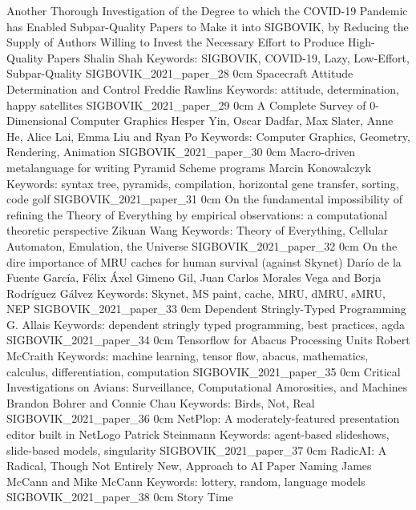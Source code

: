 \addpaper
	{Another Thorough Investigation of the Degree to which the COVID-19 Pandemic has Enabled Subpar-Quality Papers to Make it into SIGBOVIK, by Reducing the Supply of Authors Willing to Invest the Necessary Effort to Produce High-Quality Papers}
	{Shalin Shah}
	{Keywords: SIGBOVIK, COVID-19, Lazy, Low-Effort, Subpar-Quality}
	{SIGBOVIK_2021_paper_28}
	{0cm}
	{}
\addpaper
	{Spacecraft Attitude Determination and Control}
	{Freddie Rawlins}
	{Keywords: attitude, determination, happy satellites}
	{SIGBOVIK_2021_paper_29}
	{0cm}
	{}
\addpaper
	{A Complete Survey of 0-Dimensional Computer Graphics}
	{Hesper Yin, Oscar Dadfar, Max Slater, Anne He, Alice Lai, Emma Liu and Ryan Po}
	{Keywords: Computer Graphics, Geometry, Rendering, Animation}
	{SIGBOVIK_2021_paper_30}
	{0cm}
	{}
\addpaper
	{Macro-driven metalanguage for writing Pyramid Scheme programs}
	{Marcin Konowalczyk}
	{Keywords: syntax tree, pyramids, compilation, horizontal gene transfer, sorting, code golf}
	{SIGBOVIK_2021_paper_31}
	{0cm}
	{}
\addpaper
	{On the fundamental impossibility of refining the Theory of Everything by empirical observations: a computational theoretic perspective}
	{Zikuan Wang}
	{Keywords: Theory of Everything, Cellular Automaton, Emulation, the Universe}
	{SIGBOVIK_2021_paper_32}
	{0cm}
	{}
\addpaper
	{On the dire importance of MRU caches for human survival (against Skynet)}
	{Darío de la Fuente García, Félix Áxel Gimeno Gil, Juan Carlos Morales Vega and Borja Rodríguez Gálvez}
	{Keywords: Skynet, MS paint, cache, MRU, dMRU, sMRU, NEP}
	{SIGBOVIK_2021_paper_33}
	{0cm}
	{}
\addpaper
	{Dependent Stringly-Typed Programming}
	{G. Allais}
	{Keywords: dependent stringly typed programming, best practices, agda}
	{SIGBOVIK_2021_paper_34}
	{0cm}
	{}
\addpaper
	{Tensorflow for Abacus Processing Units}
	{Robert McCraith}
	{Keywords: machine learning, tensor flow, abacus, mathematics, calculus, differentiation, computation}
	{SIGBOVIK_2021_paper_35}
	{0cm}
	{}
\addpaper
	{Critical Investigations on Avians: Surveillance, Computational Amorosities, and Machines}
	{Brandon Bohrer and Connie Chau}
	{Keywords: Birds, Not, Real}
	{SIGBOVIK_2021_paper_36}
	{0cm}
	{}
\addpaper
	{NetPlop: A moderately-featured presentation editor built in NetLogo}
	{Patrick Steinmann}
	{Keywords: agent-based slideshows, slide-based models, singularity}
	{SIGBOVIK_2021_paper_37}
	{0cm}
	{}
\addpaper
	{RadicAI: A Radical, Though Not Entirely New, Approach to AI Paper Naming}
	{James McCann and Mike McCann}
	{Keywords: lottery, random, language models}
	{SIGBOVIK_2021_paper_38}
	{0cm}
	{}
\addpaper
	{Story Time}
